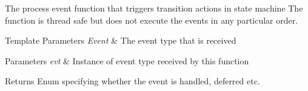 The process event function that triggers transition actions in state machine The function is thread safe but does not execute the events in any particular order. 


\begin{DoxyTemplParams}{Template Parameters}
{\em Event} & The event type that is received \\
\hline
\end{DoxyTemplParams}

\begin{DoxyParams}{Parameters}
{\em evt} & Instance of event type received by this function\\
\hline
\end{DoxyParams}
\begin{DoxyReturn}{Returns}
Enum specifying whether the event is handled, deferred etc. 
\end{DoxyReturn}


